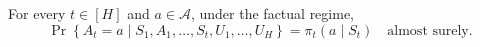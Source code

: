 For every \(t\in[H]\) and \(a\in\mathcal A\), under the factual regime,
\[
 \Pr\!\left\{A_t=a\mid S_1,A_1,\ldots,S_t,
       U_1,\ldots,U_H\right\}
   =\pi_t(a\mid S_t)
 \quad\text{almost surely}.
\]